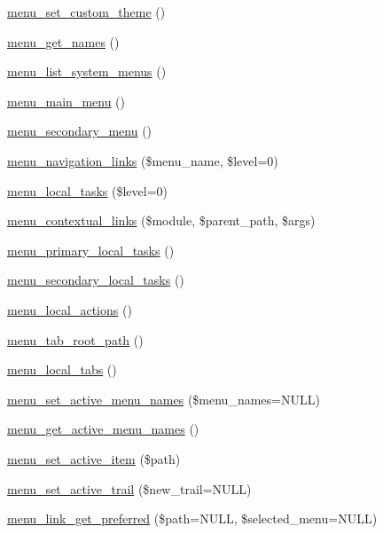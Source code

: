 \begin{DoxyCompactItemize}
\item 
\hyperlink{group__menu_ga2545be84d84b98f84857bea11f7961fb}{menu\_\-set\_\-custom\_\-theme} ()
\item 
\hyperlink{group__menu_gad15183a10857a4a4ad0504ec830443d3}{menu\_\-get\_\-names} ()
\item 
\hyperlink{group__menu_ga28e765ff428a3f18978af564ee0147d6}{menu\_\-list\_\-system\_\-menus} ()
\item 
\hyperlink{group__menu_ga47957cf684d4a76b6e8a5eac09d2db94}{menu\_\-main\_\-menu} ()
\item 
\hyperlink{group__menu_gaf4a8dad6070035a498c598c5fe9ca255}{menu\_\-secondary\_\-menu} ()
\item 
\hyperlink{group__menu_gab4cdacc813ae9e06271aa4aa2d9495a7}{menu\_\-navigation\_\-links} (\$menu\_\-name, \$level=0)
\item 
\hyperlink{group__menu_gadb8bb3644e114166950142280085cf3e}{menu\_\-local\_\-tasks} (\$level=0)
\item 
\hyperlink{group__menu_gad524d9a3415e24d27c7dbcb333d96cf8}{menu\_\-contextual\_\-links} (\$module, \$parent\_\-path, \$args)
\item 
\hyperlink{group__menu_ga83613b83f90d6a12e2f4170ed0ede9b1}{menu\_\-primary\_\-local\_\-tasks} ()
\item 
\hyperlink{group__menu_gabf84c295da2c986cd8ad305935e31ffb}{menu\_\-secondary\_\-local\_\-tasks} ()
\item 
\hyperlink{group__menu_ga150a37ede061833b2b9fde658d005426}{menu\_\-local\_\-actions} ()
\item 
\hyperlink{group__menu_gacf647362fc7151bbaa1dbe5568a0b6b5}{menu\_\-tab\_\-root\_\-path} ()
\item 
\hyperlink{group__menu_ga9fe648c89a4e94e63c7a88076ed12a94}{menu\_\-local\_\-tabs} ()
\item 
\hyperlink{group__menu_gadf802fedf19e7b29e3970e936bae9bc0}{menu\_\-set\_\-active\_\-menu\_\-names} (\$menu\_\-names=NULL)
\item 
\hyperlink{group__menu_ga421798c040a98ec1b5d583e7a7a5e65b}{menu\_\-get\_\-active\_\-menu\_\-names} ()
\item 
\hyperlink{group__menu_gacdd22102c2ba6545645ae34be563d1d4}{menu\_\-set\_\-active\_\-item} (\$path)
\item 
\hyperlink{group__menu_ga9328a9a4f297d8bb095d924e75a8abd7}{menu\_\-set\_\-active\_\-trail} (\$new\_\-trail=NULL)
\item 
\hyperlink{group__menu_gad5fbd7dfd77f1496d636d130a3ff591d}{menu\_\-link\_\-get\_\-preferred} (\$path=NULL, \$selected\_\-menu=NULL)

\end{DoxyCompactItemize}
